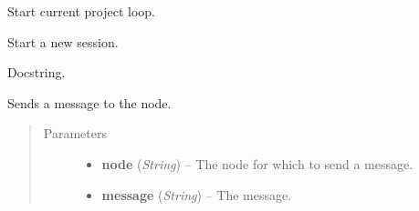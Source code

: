 \documentclass[letterpaper,10pt,english]{sphinxmanual}
\begin{document}
\begin{fulllineitems}
\begin{fulllineitems}
\end{fulllineitems}


\begin{fulllineitems}
\label{state:state.State.start_current_session}
Start current project loop.

\end{fulllineitems}


\begin{fulllineitems}
\label{state:state.State.start_new_session}
Start a new session.

\end{fulllineitems}


\begin{fulllineitems}
\label{state:state.State.stop_responsive}
Docstring.

\end{fulllineitems}


\begin{fulllineitems}
\label{state:state.State.swnp_send}
Sends a message to the node.
\begin{quote}\begin{description}
\item[{Parameters}] \leavevmode\begin{itemize}
\item {} 
\textbf{node} (\emph{String}) -- The node for which to send a message.

\item {} 
\textbf{message} (\emph{String}) -- The message.

\end{itemize}

\end{description}\end{quote}

\end{fulllineitems}


\end{fulllineitems}
\end{document}
